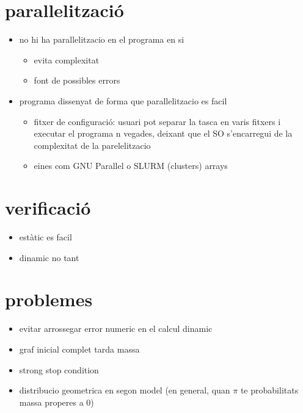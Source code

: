 \section{parallelització}
\begin{itemize}
\item no hi ha parallelitzacio en el programa en si
  \begin{itemize}
  \item evita complexitat
  \item font de possibles errors
  \end{itemize}
\item programa dissenyat de forma que parallelitzacio es facil
  \begin{itemize}
  \item fitxer de configuració: usuari pot separar la tasca en varis fitxers i
    executar el programa n vegades, deixant que el SO s'encarregui de la
    complexitat de la parelelitzacio
  \item eines com GNU Parallel o SLURM (clusters) arrays
  \end{itemize}
\end{itemize}
\section{verificació}
\begin{itemize}
\item estàtic es facil
\item dinamic no tant
\end{itemize}
\section{problemes}
\begin{itemize}
\item evitar arrossegar error numeric en el calcul dinamic
\item graf inicial complet tarda massa
\item strong stop condition
\item distribucio geometrica en segon model (en general, quan $\pi$ te probabilitats massa properes a 0)
\end{itemize}

